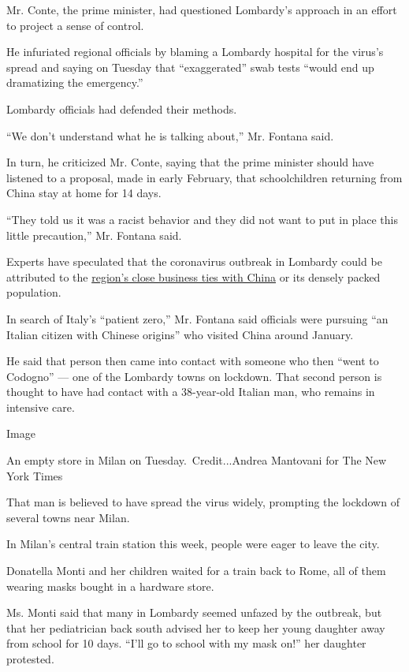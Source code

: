 Mr. Conte, the prime minister, had questioned Lombardy's approach in an
effort to project a sense of control.

He infuriated regional officials by blaming a Lombardy hospital for the
virus's spread and saying on Tuesday that ``exaggerated'' swab tests
``would end up dramatizing the emergency.''

Lombardy officials had defended their methods.

``We don't understand what he is talking about,'' Mr. Fontana said.

In turn, he criticized Mr. Conte, saying that the prime minister should
have listened to a proposal, made in early February, that schoolchildren
returning from China stay at home for 14 days.

``They told us it was a racist behavior and they did not want to put in
place this little precaution,'' Mr. Fontana said.

Experts have speculated that the coronavirus outbreak in Lombardy could
be attributed to the
\href{https://www.nytimes3xbfgragh.onion/2020/02/24/world/europe/24coronavirus-milan-italy.html}{region's
close business ties with China} or its densely packed population.

In search of Italy's ``patient zero,'' Mr. Fontana said officials were
pursuing ``an Italian citizen with Chinese origins'' who visited China
around January.

He said that person then came into contact with someone who then ``went
to Codogno'' --- one of the Lombardy towns on lockdown. That second
person is thought to have had contact with a 38-year-old Italian man,
who remains in intensive care.

Image

An empty store in Milan on Tuesday.~Credit...Andrea Mantovani for The
New York Times

That man is believed to have spread the virus widely, prompting the
lockdown of several towns near Milan.

In Milan's central train station this week, people were eager to leave
the city.

Donatella Monti and her children waited for a train back to Rome, all of
them wearing masks bought in a hardware store.

Ms. Monti said that many in Lombardy seemed unfazed by the outbreak, but
that her pediatrician back south advised her to keep her young daughter
away from school for 10 days. ``I'll go to school with my mask on!'' her
daughter protested.

